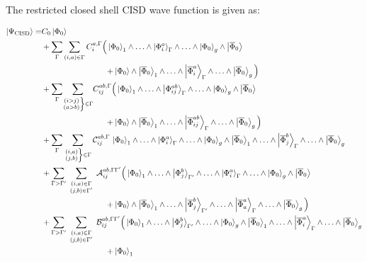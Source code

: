 The restricted closed shell CISD wave function is given as:

\newcommand{\Qquad}{\qquad\qquad\qquad\qquad}

\begin{equation}
  \label{eq:CISDwf}
  \begin{split}
    \ket{\Psi_\text{CISD}} =
    & C_0 \ket{\Phi_0}\\
    & + \sum_\irp\sum_{(i,a) \in \irp} C_{i}^{a, \irp}
    \Big(
    \ket{\Phi_0}_1
    \w \dots
    \w \ket{\Phi_i^a}_\irp
    \w \dots
    \w \ket{\Phi_0}_g
    \w \ket{\overline{\Phi}_0}
    \\ & \Qquad
    {} + \ket{\Phi_0}
    \w \ket{\overline{\Phi}_0}_1
    \w \dots
    \w \ket{\overline{\Phi}_i^a}_\irp
    \w \dots
    \w \ket{\overline{\Phi}_0}_g
    \Big)\\
    & + \sum_\irp\sumijabrestr C_{ij}^{ab, \irp}
    \Big(
    \ket{\Phi_0}_1
    \w \dots
    \w \ket{\Phi_{ij}^{ab}}_\irp
    \w \dots
    \w \ket{\Phi_0}_g
    \w \ket{\overline{\Phi}_0}
    \\ & \Qquad
    {} + \ket{\Phi_0}
    \w \ket{\overline{\Phi}_0}_1
    \w \dots
    \w \ket{\overline{\Phi}_{ij}^{ab}}_\irp
    \w \dots
    \w \ket{\overline{\Phi}_0}_g
    \Big)\\
    & + \sum_\irp \sumijabfull \Dss_{ij}^{ab, \irp} \,
    \ket{\Phi_0}_1
    \w \dots
    \w \ket{\Phi_{i}^{a}}_\irp
    \w \dots
    \w \ket{\Phi_0}_g
    \w \ket{\overline{\Phi}_0}_1
    \w \dots
    \w \ket{\overline{\Phi}_{j}^{b}}_\irp
    \w \dots
    \w \ket{\overline{\Phi}_0}_g\\
    & + \sum_{\irp > \irpP} \sumijabmix \Dmixaa_{ij}^{ab, \irp\irpP}
    \Big(
    \ket{\Phi_0}_1
    \w \dots
    \w \ket{\Phi_{j}^{b}}_\irpP
    \w \dots
    \w \ket{\Phi_{i}^{a}}_\irp
    \w \dots
    \w \ket{\Phi_0}_g
    \w \ket{\overline{\Phi}_0}
    \\ & \Qquad
    {} + \ket{\Phi_0}
    \w \ket{\overline{\Phi}_0}_1
    \w \dots
    \w \ket{\overline{\Phi}_{j}^{b}}_\irpP
    \w \dots
    \w \ket{\overline{\Phi}_{a}^{a}}_\irp
    \w \dots
    \w \ket{\overline{\Phi}_0}_g
    \Big)\\
    & + \sum_{\irp > \irpP} \sumijabmix \Dmixab_{ij}^{ab, \irp\irpP}
    \Big(
    \ket{\Phi_0}_1
    \w \dots
    \w \ket{\Phi_{j}^{b}}_\irpP
    \w \dots
    \w \ket{\Phi_0}_g
    \w \ket{\overline{\Phi}_0}_1
    \w \dots
    \w \ket{\overline{\Phi}_{i}^{a}}_\irp
    \w \dots
    \w \ket{\overline{\Phi}_0}_g
    \\ & \Qquad
    {} + \ket{\Phi_0}_1

\end{split}
\end{equation}
